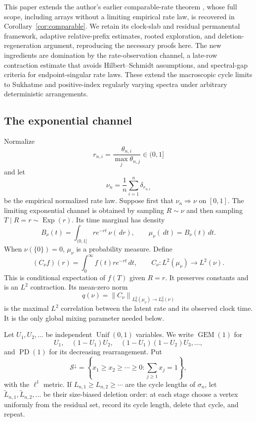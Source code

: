 \documentclass[11pt]{article}
\theoremstyle{definition}
\theoremstyle{remark}
\newcommand{\Exp}{\operatorname{Exp}}
\newcommand{\Unif}{\operatorname{Unif}}
\newcommand{\PD}{\operatorname{PD}}
\newcommand{\GEM}{\operatorname{GEM}}
\newcommand{\dd}{\,d}
\newcommand{\cS}{\mathcal S}
\newcommand{\norm}[1]{\left\lVert#1\right\rVert}
\begin{document}
This paper extends the author's earlier comparable-rate theorem
\cite{LongPD2026}, whose full scope, including arrays without a limiting
empirical rate law, is recovered in Corollary~\ref{cor:comparable}.  We retain
its clock-slab and residual permanental framework, adaptive relative-prefix
estimates, rooted exploration, and deletion-regeneration argument, reproducing
the necessary proofs here.  The new ingredients are domination by the
rate-observation channel, a late-row contraction estimate that avoids
Hilbert--Schmidt assumptions, and spectral-gap criteria for endpoint-singular
rate laws.  These extend the macroscopic cycle limits to Sukhatme and
positive-index regularly varying spectra under arbitrary deterministic
arrangements.

\subsection*{The exponential channel}

Normalize
\[
  r_{n,i}=\frac{\theta_{n,i}}{\max_j\theta_{n,j}}\in(0,1]
\]
and let
\begin{equation}
  \nu_n=\frac1n\sum_{i=1}^n\delta_{r_{n,i}}
  \label{eq:empirical-rate-law}
\end{equation}
be the empirical normalized rate law.  Suppose first that
$\nu_n\Rightarrow\nu$ on $[0,1]$.  The limiting exponential channel is obtained
by sampling $R\sim\nu$ and then sampling $T\mid R=r\sim\Exp(r)$.  Its time
marginal has density
\begin{equation}
  B_\nu(t)=\int_{(0,1]} r e^{-rt}\,\nu(\dd r),
  \qquad
  \mu_\nu(\dd t)=B_\nu(t)\dd t.
  \label{eq:Bnu}
\end{equation}
When $\nu(\{0\})=0$, $\mu_\nu$ is a probability measure.  Define
\begin{equation}
  (C_\nu f)(r)=\int_0^\infty f(t)r e^{-rt}\dd t,
  \qquad
  C_\nu:L^2(\mu_\nu)\longrightarrow L^2(\nu).
  \label{eq:channel}
\end{equation}
This is conditional expectation of $f(T)$ given $R=r$.  It preserves constants
and is an $L^2$ contraction.  Its mean-zero norm
\begin{equation}
  q(\nu)=
  \norm{C_\nu}_{L^2_0(\mu_\nu)\to L^2_0(\nu)}
  \label{eq:qnu}
\end{equation}
is the maximal $L^2$ correlation between the latent rate and its observed
clock time.  It is the only global mixing parameter needed below.

Let $U_1,U_2,\ldots$ be independent $\Unif(0,1)$ variables.  We write
$\GEM(1)$ for
\[
 U_1,\quad (1-U_1)U_2,\quad
 (1-U_1)(1-U_2)U_3,\ldots,
\]
and $\PD(1)$ for its decreasing rearrangement.  Put
\[
 \cS^\downarrow
 =\left\{x_1\ge x_2\ge\cdots\ge0:
          \sum_{j\ge1}x_j=1\right\},
\]
with the $\ell^1$ metric.  If
$L_{n,1}\ge L_{n,2}\ge\cdots$ are the cycle lengths of $\sigma_n$, let
$\widetilde L_{n,1},\widetilde L_{n,2},\ldots$ be their size-biased deletion
order: at each stage choose a vertex uniformly from the residual set, record
its cycle length, delete that cycle, and repeat.
\end{document}
